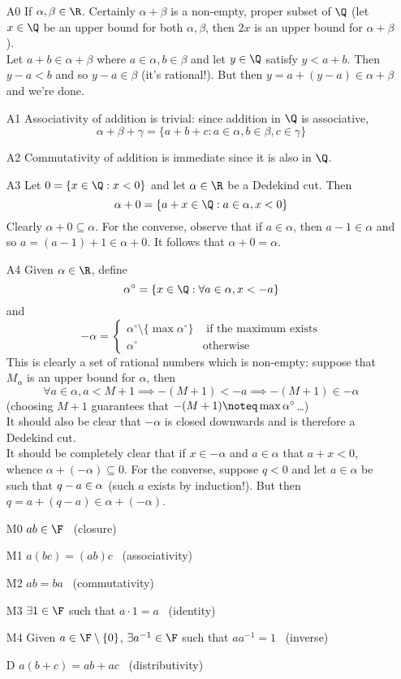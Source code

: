 \begin{description}
\begin{itemize}
	\item[A0] If $\alpha,\beta\in\R$. Certainly $\alpha+\beta$ is a non-empty, proper subset of $\Q$ (let $x\in\Q$ be an upper bound for both $\alpha,\beta$, then $2x$ is an upper bound for $\alpha+\beta$).\\
	Let $a+b\in\alpha+\beta$ where $a\in\alpha,b\in\beta$ and let $y\in\Q$ satisfy $y<a+b$. Then $y-a<b$ and so $y-a\in\beta$ (it's rational!). But then $y=a+(y-a)\in\alpha+\beta$ and we're done. 
	\item[A1] Associativity of addition is trivial: since addition in $\Q$ is associative,
	\[\alpha+\beta+\gamma=\{a+b+c:a\in\alpha,b\in\beta,c\in\gamma\}\]
	\item[A2] Commutativity of addition is immediate since it is also in $\Q$.
	\item[A3] Let $0=\{x\in\Q:x<0\}$ and let $\alpha\in\R$ be a Dedekind cut. Then
	\[\alpha+0=\{a+x\in\Q:a\in\alpha,x<0\}\]
	Clearly $\alpha+0\subseteq\alpha$. For the converse, observe that if $a\in\alpha$, then $a-1\in\alpha$ and so $a=(a-1)+1\in\alpha+0$. It follows that $\alpha+0=\alpha$. 
	\item[A4] Given $\alpha\in\R$, define\
	\[\alpha^\circ=\{x\in\Q:\forall a\in\alpha, x<-a\}\]
	and
	\[-\alpha=\begin{cases}
	\alpha^\circ\setminus\{\max\alpha^\circ\}&\text{ if the maximum exists}\\
	\alpha^\circ&\text{otherwise}
	\end{cases}\]
	This is clearly a set of rational numbers which is non-empty: suppose that $M_\alpha$ is an upper bound for $\alpha$, then
	\[\forall a\in \alpha, a<M+1\implies -(M+1)<-a\implies -(M+1)\in -\alpha\]
	(choosing $M+1$ guarantees that $-(M+1)\noteq\max\alpha^\circ$\ldots)\\
	It should also be clear that $-\alpha$ is closed downwards and is therefore a Dedekind cut.\\
	It should be completely clear that if $x\in-\alpha$ and $a\in\alpha$ that $a+x<0$, whence $\alpha+(-\alpha)\subseteq 0$. For the converse, suppose $q<0$ and let $a\in\alpha$ be such that $q-a\in\-\alpha$ (such $a$ exists by induction!). But then $q=a+(q-a)\in\alpha+(-\alpha)$.
\item[M0] $ab\in\F$ \ (closure)
\item[M1] $a(bc)=(ab)c$ \ (associativity)
\item[M2] $ab=ba$ \ (commutativity)
\item[M3] $\exists 1\in\F$ such that $a\cdot 1=a$ \ (identity)
\item[M4] Given $a\in\F\setminus\{0\}$, $\exists a^{-1}\in\F$ such that $aa^{-1}=1$ \ (inverse)
\item[D] $a(b+c)=ab+ac$ \ (distributivity)
\end{itemize}
\end{description}

